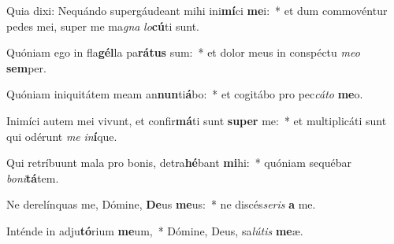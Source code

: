 \item Quia dixi: Nequándo supergáudeant mihi ini\textbf{mí}ci \textbf{me}i:~* et dum commovéntur pedes mei, super me ma\textit{gna} \textit{lo}\textbf{cú}ti sunt.
\item Quóniam ego in fla\textbf{gél}la pa\textbf{rá}\textbf{tus} sum:~* et dolor meus in conspéctu \textit{me}\textit{o} \textbf{sem}per.
\item Quóniam iniquitátem meam an\textbf{nun}ti\textbf{á}bo:~* et cogitábo pro pec\textit{cá}\textit{to} \textbf{me}o.
\item Inimíci autem mei vivunt, et confir\textbf{má}ti sunt \textbf{su}\textbf{per} me:~* et multiplicáti sunt qui odérunt \textit{me} \textit{in}\textbf{í}que.
\item Qui retríbuunt mala pro bonis, detra\textbf{hé}bant \textbf{mi}hi:~* quóniam sequébar \textit{bo}\textit{ni}\textbf{tá}tem.
\item Ne derelínquas me, Dómine, \textbf{De}us \textbf{me}us:~* ne discés\textit{se}\textit{ris} \textbf{a} me.
\item Inténde in adju\textbf{tó}rium \textbf{me}um,~* Dómine, Deus, sa\textit{lú}\textit{tis} \textbf{me}æ.

